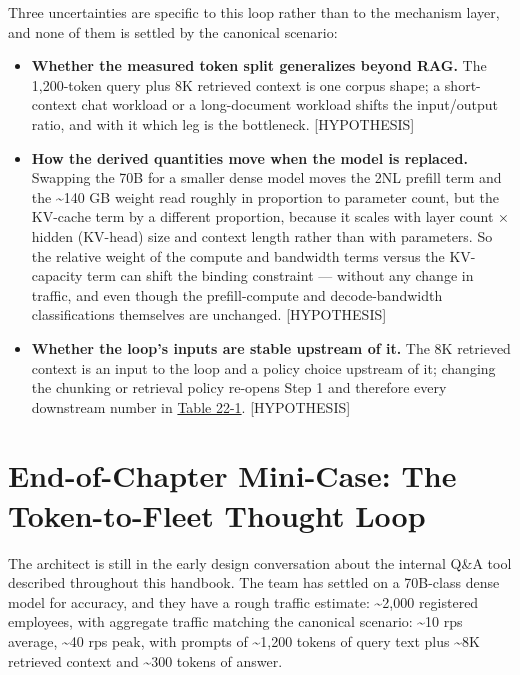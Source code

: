 Three uncertainties are specific to this loop rather than to the
mechanism layer, and none of them is settled by the canonical scenario:

\begin{itemize}
\tightlist
\item
  \textbf{Whether the measured token split generalizes beyond RAG.} The
  1,200-token query plus 8K retrieved context is one corpus shape; a
  short-context chat workload or a long-document workload shifts the
  input/output ratio, and with it which leg is the bottleneck.
  \mbox{{[}HYPOTHESIS{]}}
\item
  \textbf{How the derived quantities move when the model is replaced.}
  Swapping the 70B for a smaller dense model moves the 2NL prefill term
  and the \textasciitilde140 GB weight read roughly in proportion to
  parameter count, but the KV-cache term by a different proportion,
  because it scales with layer count × hidden (KV-head) size and context
  length rather than with parameters. So the relative weight of the
  compute and bandwidth terms versus the KV-capacity term can shift the
  binding constraint --- without any change in traffic, and even though
  the prefill-compute and decode-bandwidth classifications themselves
  are unchanged. \mbox{{[}HYPOTHESIS{]}}
\item
  \textbf{Whether the loop's inputs are stable upstream of it.} The 8K
  retrieved context is an input to the loop and a policy choice upstream
  of it; changing the chunking or retrieval policy re-opens Step 1 and
  therefore every downstream number in \hyperref[tab:22.1]{Table 22-1}. \mbox{{[}HYPOTHESIS{]}}
\end{itemize}

\section{End-of-Chapter Mini-Case: The Token-to-Fleet Thought
Loop}\label{end-of-chapter-mini-case-the-token-to-fleet-thought-loop}

The architect is still in the early design conversation about the
internal Q\&A tool described throughout this handbook. The team has
settled on a 70B-class dense model for accuracy, and they have a rough
traffic estimate: \textasciitilde2,000 registered employees, with
aggregate traffic matching the canonical scenario: \textasciitilde10 rps
average, \textasciitilde40 rps peak, with prompts of
\textasciitilde1,200 tokens of query text plus \textasciitilde8K
retrieved context and \textasciitilde300 tokens of answer.

